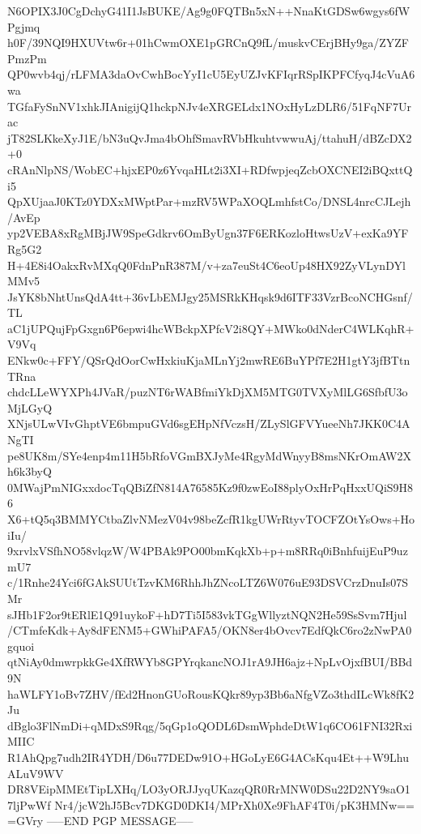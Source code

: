 N6OPIX3J0CgDchyG41I1JsBUKE/Ag9g0FQTBn5xN++NnaKtGDSw6wgys6fWPgjmq
h0F/39NQI9HXUVtw6r+01hCwmOXE1pGRCnQ9fL/muskvCErjBHy9ga/ZYZFPmzPm
QP0wvb4qj/rLFMA3daOvCwhBocYyI1cU5EyUZJvKFIqrRSpIKPFCfyqJ4cVuA6wa
TGfaFySnNV1xhkJIAnigijQ1hckpNJv4eXRGELdx1NOxHyLzDLR6/51FqNF7Urac
jT82SLKkeXyJ1E/bN3uQvJma4bOhfSmavRVbHkuhtvwwuAj/ttahuH/dBZcDX2+0
cRAnNlpNS/WobEC+hjxEP0z6YvqaHLt2i3XI+RDfwpjeqZcbOXCNEI2iBQxttQi5
QpXUjaaJ0KTz0YDXxMWptPar+mzRV5WPaXOQLmhfstCo/DNSL4nrcCJLejh/AvEp
yp2VEBA8xRgMBjJW9SpeGdkrv6OmByUgn37F6ERKozloHtwsUzV+exKa9YFRg5G2
H+4E8i4OakxRvMXqQ0FdnPnR387M/v+za7euSt4C6eoUp48HX92ZyVLynDYlMMv5
JsYK8bNhtUnsQdA4tt+36vLbEMJgy25MSRkKHqsk9d6ITF33VzrBcoNCHGsnf/TL
aC1jUPQujFpGxgn6P6epwi4hcWBckpXPfcV2i8QY+MWko0dNderC4WLKqhR+V9Vq
ENkw0c+FFY/QSrQdOorCwHxkiuKjaMLnYj2mwRE6BuYPf7E2H1gtY3jfBTtnTRna
chdcLLeWYXPh4JVaR/puzNT6rWABfmiYkDjXM5MTG0TVXyMlLG6SfbfU3oMjLGyQ
XNjsULwVIvGhptVE6bmpuGVd6sgEHpNfVczsH/ZLySlGFVYueeNh7JKK0C4ANgTI
pe8UK8m/SYe4enp4m11H5bRfoVGmBXJyMe4RgyMdWnyyB8msNKrOmAW2Xh6k3byQ
0MWajPmNIGxxdocTqQBiZfN814A76585Kz9f0zwEoI88plyOxHrPqHxxUQiS9H86
X6+tQ5q3BMMYCtbaZlvNMezV04v98beZcfR1kgUWrRtyvTOCFZOtYsOws+HoiIu/
9xrvlxVSfhNO58vlqzW/W4PBAk9PO00bmKqkXb+p+m8RRq0iBnhfuijEuP9uzmU7
c/1Rnhe24Yci6fGAkSUUtTzvKM6RhhJhZNcoLTZ6W076uE93DSVCrzDnuIs07SMr
sJHb1F2or9tERlE1Q91uykoF+hD7Ti5I583vkTGgWllyztNQN2He59SsSvm7Hjul
/CTmfeKdk+Ay8dFENM5+GWhiPAFA5/OKN8er4bOvcv7EdfQkC6ro2zNwPA0gquoi
qtNiAy0dmwrpkkGe4XfRWYb8GPYrqkancNOJ1rA9JH6ajz+NpLvOjxfBUI/BBd9N
haWLFY1oBv7ZHV/fEd2HnonGUoRousKQkr89yp3Bb6aNfgVZo3thdILcWk8fK2Ju
dBglo3FlNmDi+qMDxS9Rqg/5qGp1oQODL6DsmWphdeDtW1q6CO61FNI32RxiMIIC
R1AhQpg7udh2IR4YDH/D6u77DEDw91O+HGoLyE6G4ACsKqu4Et++W9LhuALuV9WV
DR8VEipMMEtTipLXHq/LO3yORJJyqUKazqQR0RrMNW0DSu22D2NY9saO17ljPwWf
Nr4/jcW2hJ5Bcv7DKGD0DKI4/MPrXh0Xe9FhAF4T0i/pK3HMNw==
=GVry
-----END PGP MESSAGE-----
